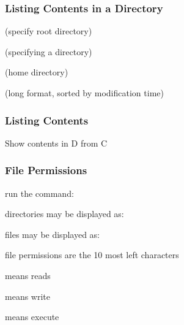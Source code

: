 \documentclass[12pt]{beamer}\usepackage[]{graphicx}\usepackage[]{color}
\begin{document}

\begin{frame}
\frametitle{Listing Contents in a Directory}
\bbi
  \item {} (specify root directory)
  \item {} (specifying a directory)
  \item {} (home directory)
  \item {} (long format, sorted by modification time)
\ei
\end{frame}


\begin{frame}[fragile]
\frametitle{Listing Contents}
\begin{center}
\end{center}

Show contents in D from C \\
{\hilit {}}

\end{frame}


\begin{frame}
\begin{center}
\Huge{}
\end{center}
\end{frame}


\begin{frame}
\frametitle{File Permissions}
\bi
  \item run the command: 
  \item directories may be displayed as: 
  \item files may be displayed as: 
  \item file permissions are the 10 most left characters
  \item {} means reads
  \item {} means write
  \item {} means execute
\ei
\end{frame}

\end{document}
